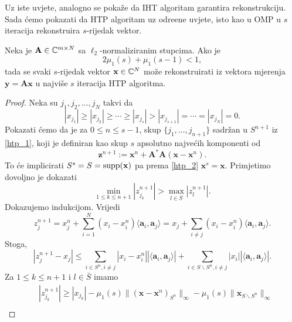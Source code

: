 \documentclass[a4paper,twoside,12pt]{memoir} %
\newcommand{\vect}[1]{\mathbf{#1}}
\renewcommand{\vec}{\vect}
\newcommand{\supp}{\text{\normalfont{supp}}}
\newcommand{\norm}[1]{\|{#1}\|}
\begin{document}
Uz iste uvjete, analogno se poka\v{z}e da IHT algoritam garantira rekonstrukciju. Sada \'cemo pokazati da HTP algoritam uz odre\dj ene uvjete, isto kao u OMP u $s$ iteracija rekonstruira $s$-rijedak vektor.
\begin{thm}\label{tm:5:17}
    Neka je $\vec A \in \C^{m \times N}$ sa $\ell_2$-normaliziranim stupcima. Ako je
    \begin{equation*}
        2 \mu_1(s) + \mu_1(s-1) < 1, 
    \end{equation*}
    tada se svaki $s$-rijedak vektor $\vec x \in \C^N$ mo\v{z}e rekonstruirati iz vektora mjerenja $ \vec y = \vec{Ax}$ u najvi\v{s}e $s$ iteracija HTP algoritma.
\end{thm}
\begin{proof}
    Neka su $j_1, j_2, \dots, j_N$ takvi da
    \begin{equation*}
        |x_{j_1}| \geq |x_{j_2}| \geq \cdots \geq |x_{j_s}| > |x_{j_{s+1}}| = \cdots = |x_{j_N}| = 0.
    \end{equation*}
    Pokazati \'cemo da je za $0 \leq n \leq s - 1$, skup $\{j_1, \dots, j_{n+1}\}$ sadr\v{z}an u $S^{n+1}$ iz \eqref{htp_1}, koji je definiran kao skup $s$ apsolutno najve\'cih komponenti od 
    \begin{equation}\label{5:18}
        \vec z^{n+1} := \vec x^n + \vec A^* \vec A(\vec x - \vec x^n). 
    \end{equation}
    To \'ce implicirati $S^s = S = \supp(\vec x)$ pa prema \eqref{htp_2} $\vec x^s = \vec x$. Primjetimo dovoljno je dokazati
    \begin{equation}\label{5:19}
        \min_{1 \leq k \leq n+1} |z_{j_k}^{n+1}| > \max_{l \in \bar S}|z_{l}^{n+1}|.
    \end{equation}
    Dokazujemo indukcijom. Vrijedi
    \begin{equation*}
        z_j^{n+1} = x_j^n + \sum_{i = 1}^N (x_i - x_i^n) \langle \vec a_i, \vec a_j \rangle = x_j + \sum_{i \neq j}(x_i - x_i^n) \langle \vec a_i, \vec a_j \rangle.
    \end{equation*}
    Stoga,
    \begin{equation}\label{5:20}
        |z_j^{n+1} - x_j| \leq \sum_{i \in S^n, i \neq j} |x_i - x_i^n|| \langle \vec a_i, \vec a_j \rangle| + \sum_{i \in S \backslash S^n, i \neq j} |x_i||\langle \vec a_i, \vec a_j \rangle|.
    \end{equation}
    Za $1 \leq k \leq n + 1$ i $l \in \bar S$ imamo
    \begin{align} 
        &|z_{j_k}^{n+1}| \geq |x_{j_k}| - \mu_1(s)\norm{ ( \vec x - \vec x^n )_{S^n} }_{\infty } - \mu_1(s) \norm{\vec x_{S \backslash S^n}}_{\infty} \label{5:21} \\[1em]

\end{align}
\end{proof}
\end{document}
